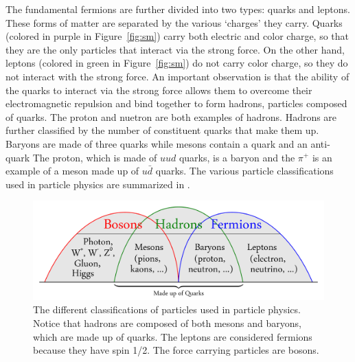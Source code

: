 The fundamental fermions are further divided into two types: quarks and leptons.
These forms of matter are separated by the various `charges' they carry. Quarks
(colored in purple in Figure~\ref{fig:sm})
carry both electric and color charge, so that they are the only particles that
interact via the strong force. 
On the other hand, leptons (colored in green in Figure~\ref{fig:sm}) 
do not carry color charge, so they do not interact with the strong force.
An important observation is that the ability of the quarks to interact via the
strong force allows them to overcome their electromagnetic repulsion and bind
together to form hadrons, particles composed of quarks. The proton and nuetron
are both examples of hadrons. Hadrons are further classified by the number
of constituent quarks that make them up. Baryons are made of three quarks while
mesons contain a quark and an anti-quark 
The proton, which is made of $uud$ quarks, is a baryon and
the $\pi^+$ is an example of a meson made up of $u\bar d$ quarks.
The various particle classifications used in particle physics are summarized in
.

\begin{figure}[htbp]
    \centering
    \includegraphics[scale=0.08, angle=0]{./figures/Bosons-Hadrons-Fermions}
    \caption{The different classifications of particles used in particle physics. Notice that hadrons are composed of both mesons and baryons, which are made up of quarks.
    The leptons are considered fermions because they have spin 1/2. The force carrying particles are bosons.}
    \label{fig:partclass}
\end{figure}

